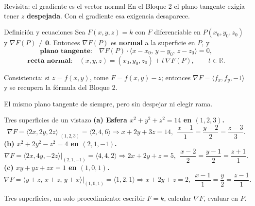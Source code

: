 \documentclass[11pt,aspectratio=169]{beamer}
\begin{document}
\begin{frame}{Revisita: el gradiente es el vector normal}
  En el Bloque 2 el plano tangente exigía tener $z$ \textbf{despejada}. Con el gradiente esa exigencia desaparece.
  \pause
  \vspace{4pt}
  \begin{block}{Definición y ecuaciones}
    Sea $F(x,y,z)=k$ con $F$ diferenciable en $P(x_0,y_0,z_0)$ y $\nabla F(P)\neq\mathbf 0$. Entonces $\nabla F(P)$ es \textbf{normal} a la superficie en $P$, y
    \[
      \textbf{plano tangente:}\quad
      \nabla F(P)\cdot\langle x-x_0,\,y-y_0,\,z-z_0\rangle=0,
    \]
    \[
      \textbf{recta normal:}\quad
      (x,y,z)=(x_0,y_0,z_0)+t\,\nabla F(P),\qquad t\in\mathbb R.
    \]
  \end{block}
  \pause
  \vspace{2pt}
  \begin{center}\small\color{gray60} Consistencia: si $z=f(x,y)$, tome $F=f(x,y)-z$; entonces $\nabla F=\langle f_x,f_y,-1\rangle$ y se recupera la fórmula del Bloque 2.\end{center}
  \pause
  \vspace{-2pt}
  \begin{center}\small\color{tealx} El mismo plano tangente de siempre, pero sin despejar ni elegir rama.\end{center}
\end{frame}

\begin{frame}{Tres superficies de un vistazo}
  \small
  \textbf{(a) Esfera $x^2+y^2+z^2=14$ en $(1,2,3)$.}
  \[
    \nabla F=\langle 2x,2y,2z\rangle\big|_{(1,2,3)}=\langle 2,4,6\rangle
    \Rightarrow \boxed{x+2y+3z=14},\ \
    \frac{x-1}{1}=\frac{y-2}{2}=\frac{z-3}{3}.
  \]
  \pause
  \textbf{(b) $x^2+2y^2-z^2=4$ en $(2,1,-1)$.}
  \[
    \nabla F=\langle 2x,4y,-2z\rangle\big|_{(2,1,-1)}=\langle 4,4,2\rangle
    \Rightarrow \boxed{2x+2y+z=5},\ \
    \frac{x-2}{2}=\frac{y-1}{2}=\frac{z+1}{1}.
  \]
  \pause
  \textbf{(c) $xy+yz+zx=1$ en $(1,0,1)$.}
  \[
    \nabla F=\langle y+z,\,x+z,\,y+x\rangle\big|_{(1,0,1)}=\langle 1,2,1\rangle
    \Rightarrow \boxed{x+2y+z=2},\ \
    \frac{x-1}{1}=\frac{y}{2}=\frac{z-1}{1}.
  \]
  \pause
  \begin{center}\small\color{gray60} Tres superficies, un solo procedimiento: escribir $F=k$, calcular $\nabla F$, evaluar en $P$.\end{center}
\end{frame}

\end{document}
